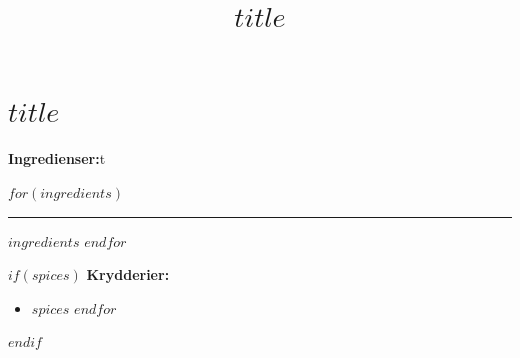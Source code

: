 \documentclass[14pt]{extarticle}
\title{$title$}
\author{}
\date{}
\begin{document}
\section*{\Large $title$}

\textbf{Ingredienser:}t
\begin{todolist} %
$for(ingredients)$
\item \rule{3cm}{0.15mm} $ingredients$
$endfor$

\end{todolist}


$if(spices)$
\textbf{Krydderier:}
\begin{itemize}[noitemsep,topsep=0pt]
$for(spices)$
\item $spices$
$endfor$

\end{itemize}
$endif$
\end{document}
